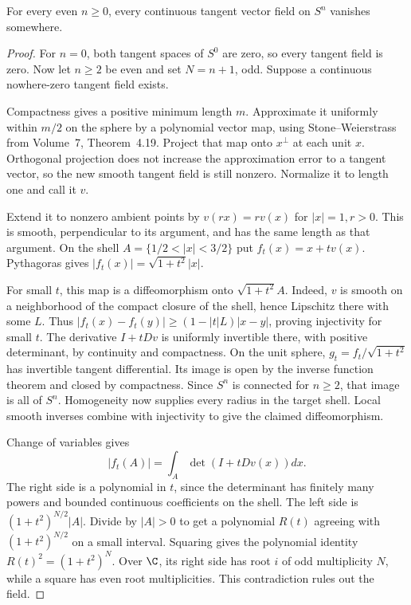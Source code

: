 \begin{theorem}\label{thm:hairyball}
For every even $n\ge0$, every continuous tangent vector field on $S^n$ vanishes somewhere.
\end{theorem}

\begin{proof}
For $n=0$, both tangent spaces of $S^0$ are zero, so every tangent field is zero. Now let $n\ge2$ be even and set $N=n+1$, odd. Suppose a continuous nowhere-zero tangent field exists.

Compactness gives a positive minimum length $m$. Approximate it uniformly within $m/2$ on the sphere by a polynomial vector map, using Stone--Weierstrass from Volume~7, Theorem~4.19. Project that map onto $x^\perp$ at each unit $x$. Orthogonal projection does not increase the approximation error to a tangent vector, so the new smooth tangent field is still nonzero. Normalize it to length one and call it $v$.

Extend it to nonzero ambient points by $v(rx)=rv(x)$ for $|x|=1,r>0$. This is smooth, perpendicular to its argument, and has the same length as that argument. On the shell $A=\{1/2<|x|<3/2\}$ put $f_t(x)=x+tv(x)$. Pythagoras gives
$|f_t(x)|=\sqrt{1+t^2}|x|$.

For small $t$, this map is a diffeomorphism onto $\sqrt{1+t^2}A$. Indeed, $v$ is smooth on a neighborhood of the compact closure of the shell, hence Lipschitz there with some $L$. Thus $|f_t(x)-f_t(y)|\ge(1-|t|L)|x-y|$, proving injectivity for small $t$. The derivative $I+tDv$ is uniformly invertible there, with positive determinant, by continuity and compactness. On the unit sphere, $g_t=f_t/\sqrt{1+t^2}$ has invertible tangent differential. Its image is open by the inverse function theorem and closed by compactness. Since $S^n$ is connected for $n\ge2$, that image is all of $S^n$. Homogeneity now supplies every radius in the target shell. Local smooth inverses combine with injectivity to give the claimed diffeomorphism.

Change of variables gives
\[
|f_t(A)|=\int_A\det(I+tDv(x))dx.
\]
The right side is a polynomial in $t$, since the determinant has finitely many powers and bounded continuous coefficients on the shell. The left side is $(1+t^2)^{N/2}|A|$. Divide by $|A|>0$ to get a polynomial $R(t)$ agreeing with $(1+t^2)^{N/2}$ on a small interval. Squaring gives the polynomial identity $R(t)^2=(1+t^2)^N$. Over $\C$, its right side has root $i$ of odd multiplicity $N$, while a square has even root multiplicities. This contradiction rules out the field.
\end{proof}

